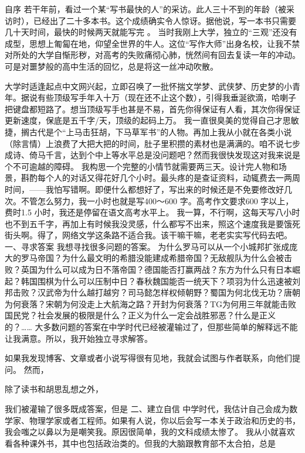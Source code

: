 自序
若干年前，看过一个某“写书最快的人”的采访。此人三十不到的年龄（被采访时），已经出了二十多本书。这个成绩确实令人惊讶。据他说，写一本书只需要几十天时间，最快的时候两天就能写完 。
当时我刚上大学，独立的“三观”还没有成型，思想上匍匐在地，仰望全世界的牛人。这位“写作大师”出身名校，让我不禁对所处的大学自惭形秽，对高考的失败痛彻心肺，恍然间有回去复读一年的冲动。可是对噩梦般的高中生活的回忆，总是将这一丝冲动吹散。

大学时适逢起点中文网兴起，立即召唤了一批怀揣文学梦、武侠梦、历史梦的小青年。据说有些顶级写手年入十万（现在还不止这个数），引得我垂涎欲滴，哈喇子把键盘都短路了。想当顶级写手也甚是不易，首先你得保证有人看，其次你得保证更新速度，保底是五千字/天，顶级的起码上万。
我一直很臭美的觉得自己才思敏捷，搁古代是个“上马击狂胡，下马草军书”的人物。再加上我从小就在各类小说（除言情）上浪费了大把大把的时间，肚子里积攒的素材也是满满的。咱不说七步成诗、倚马千言，达到个中上等水平总是没问题吧？然而我很快发现这对我来说是个不可逾越的障碍。
我构思一个完整的小情节就需要两三天。设计完人物和场景，斟酌每个人的对话又得花好几个小时。最头疼的是查证资料，动辄费去一两周时间，——我怕写错啊。即便什么都想好了，写出来的时候还是不免要修改好几次。不管怎么努力，我一小时也就是写400～600 字。高考作文要求600 字以上，费时1.5 小时，我还是停留在语文高考水平上。
我一算，不行啊，这每天写八小时也不到五千字，再加上有时候我没灵感，什么都写不出来，照这个速度我是要饿死街头啊。得了，网络文学这条路不适合我。该干嘛干嘛，老老实实写代码去吧。
一、寻求答案
我想寻找很多问题的答案。
为什么罗马可以从一个小城邦扩张成庞大的罗马帝国？为什么最文明的希腊没能建成希腊帝国？无敌舰队为什么会被击败？英国为什么可以成为日不落帝国？德国能否打赢两战？东方为什么只有日本崛起？韩国围棋为什么可以压制中日？春秋魏国能否一统天下？项羽为什么迅速被刘邦击败？汉武帝为什么越打越穷？司马懿怎样权倾朝野？蜀国为何北伐无功？唐朝为何衰落？宋朝为何没走上大航海之路？开封为何衰落？TG为何用三年就能击败国民党？社会发展的极限是什么？正义为什么一定会战胜邪恶？什么是正义的？……
大多数问题的答案在中学时代已经被灌输过了，但那些简单的解释远不能让我满意。所以，我开始独立寻求解答。

如果我发现博客、文章或者小说写得很有见地，我就会试图与作者联系，向他们提问。
然而，

除了读书和胡思乱想之外，

我们被灌输了很多既成答案，但是
二、建立自信
中学时代，我估计自己会成为数学家、物理学家或者工程师。如果有人说，你以后会写一本关于政治和历史的书，我会嗤之以鼻以为是嘲笑我。原因很简单，我的文科成绩太惨了。
我从小就喜欢看各种课外书，其中也包括政治类的。但我的大脑跟教育部不太合拍，总是
	

